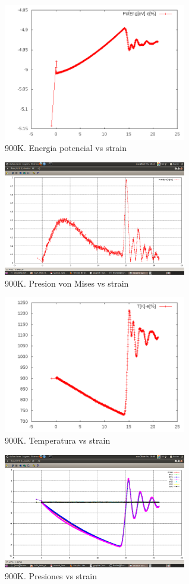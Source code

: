 \documentclass[10pt, oneside]{article} %
\begin{document}
\begin{figure}[H]
\centering
\includegraphics[width=8cm]{Figures/900K_PotEnergy.png}
\caption{900K. Energia potencial vs strain}
\end{figure}

\begin{figure}[H]
\centering
\includegraphics[width=8cm]{Figures/900K_PressVonMises.png}
\caption{900K. Presion von Mises vs strain}
\end{figure}

\begin{figure}[H]
\centering
\includegraphics[width=8cm]{Figures/900K_Temp.png}
\caption{900K. Temperatura vs strain}
\end{figure}

\begin{figure}[H]
\centering
\includegraphics[width=8cm]{Figures/900K_TensorPress.png}
\caption{900K. Presiones vs strain}
\end{figure}
\end{document}
